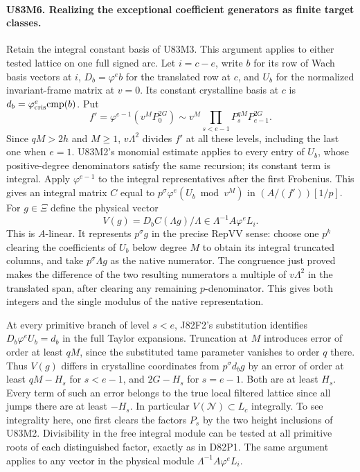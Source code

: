 \paragraph{U83M6. Realizing the exceptional coefficient generators as finite target classes.}
Retain the integral constant basis of U83M3. This argument applies
to either tested lattice on one full signed arc. Let $i=c-e$,
write $b$ for its row of Wach basis vectors at $i$, $D_b=\varphi^e b$
for the translated row at $c$, and $U_b$ for the normalized
invariant-frame matrix at $v=0$. Its constant crystalline basis
at $c$ is $d_b=\varphi_{\rm cris}^e\mathrm{cmp}(b)$.
Put
\[
    f'=\varphi^{e-1}(v^M P_0^{2G})
       \sim v^M\prod_{s<e-1}P_s^{qM}P_{e-1}^{2G} .
\]
Since $qM>2h$ and $M\ge1$, $v\Lambda^2$ divides $f'$ at
all these levels, including the last one when $e=1$.
U83M2's monomial estimate applies to every entry of $U_b$,
whose positive-degree denominators satisfy the same recursion;
its constant term is integral. Apply $\varphi^{e-1}$ to the
integral representatives after the first Frobenius. This gives
an integral matrix $C$ equal to $p^\sigma\varphi^e(U_b\bmod v^M)$
in $(A/(f'))[1/p]$. For $g\in\Xi$ define the physical vector
\[
     V(g)=D_b C(\Lambda g)/\Lambda\in
              \Lambda^{-1}A\varphi^e L_i .
\]
This is $A$-linear. It represents $p^\sigma g$ in the precise
$\mathrm{RepVV}$ sense: choose one $p^k$ clearing the coefficients
of $U_b$ below degree $M$ to obtain its integral truncated columns,
and take $p^\sigma\Lambda g$ as the native numerator. The
congruence just proved makes the difference of the two resulting
numerators a multiple of $v\Lambda^2$ in the translated span,
after clearing any remaining $p$-denominator. This gives both
integers and the single modulus of the native representation.

At every primitive branch of level $s<e$, J82F2's substitution
identifies $D_b\varphi^e U_b=d_b$ in the full Taylor expansions.
Truncation at $M$ introduces error of order at least $qM$, since
the substituted tame parameter vanishes to order $q$ there. Thus
$V(g)$ differs in crystalline coordinates from $p^\sigma d_b g$
by an error of order at least $qM-H_s$ for $s<e-1$, and
$2G-H_s$ for $s=e-1$. Both are at least $H_s$. Every term of
such an error belongs to the true local filtered lattice since
all jumps there are at least $-H_s$. In particular
$V(\mathcal N)\subset L_c$ integrally. To see integrality here,
one first clears the factors $P_s$ by the two height inclusions
of U83M2. Divisibility in the free integral module can be tested
at all primitive roots of each distinguished factor, exactly as
in D82P1. The same argument applies to any vector in the
physical module $\Lambda^{-1}A\varphi^eL_i$.

